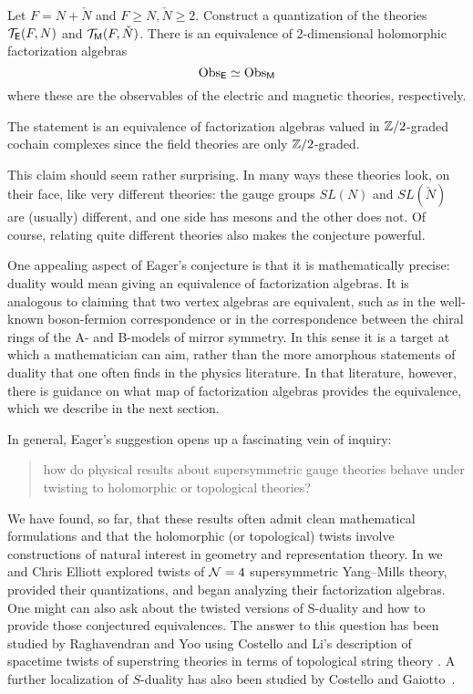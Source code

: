 \documentclass[11pt]{amsart}
\begin{document}
\begin{conj*}
Let $F = N + \check{N}$ and $F \geq N, \check{N} \geq 2$.
Construct a quantization of the theories $\mathcal T_{\mathsf E}(F,N)$ and $\mathcal T_{{\sf M}}(F,\check{N})$.
There is an equivalence of 2-dimensional holomorphic factorization algebras
\[
{\rm Obs}_{\mathsf E} \simeq {\rm Obs}_{{\sf M}}  
\]
where these are the observables of the electric and magnetic theories, respectively.
\end{conj*}

\begin{rmk}
The statement is an equivalence of factorization algebras valued in $\mathbb Z/2$-graded cochain complexes since the field theories are only $\mathbb Z/2$-graded.
\end{rmk}

This claim should seem rather surprising.
In many ways these theories look, on their face, like very different theories:
the gauge groups $SL(N)$ and $SL(\check{N})$ are (usually) different, and
one side has mesons and the other does not.
Of course, relating quite different theories also makes the conjecture powerful.

One appealing aspect of Eager's conjecture is that it is mathematically precise:
duality would mean giving an equivalence of factorization algebras.
It is analogous to claiming that two vertex algebras are equivalent,
such as in the well-known boson-fermion correspondence or in the correspondence between the chiral rings of the A- and B-models of mirror symmetry.
In this sense it is a target at which a mathematician can aim,
rather than the more amorphous statements of duality that one often finds in the physics literature.
In that literature, however, there is guidance on what map of factorization algebras provides the equivalence,
which we describe in the next section.

In general, Eager's suggestion opens up a fascinating vein of inquiry:
\begin{quote}
how do physical results about supersymmetric gauge theories behave under twisting to holomorphic or topological theories?
\end{quote}
We have found, so far, that these results often admit clean mathematical formulations and that the holomorphic (or topological) twists involve constructions of natural interest in geometry and representation theory.
In \cite{EGW} we and Chris Elliott explored twists of $\mathcal N=4$ supersymmetric Yang--Mills theory,
provided their quantizations, and began analyzing their factorization algebras.
One might can also ask about the twisted versions of S-duality and how to provide those conjectured equivalences.
The answer to this question has been studied by Raghavendran and Yoo \cite{RYsduality} using Costello and Li's description of spacetime twists of superstring theories in terms of topological string theory \cite{CLsugra,CLtypeI}. 
A further localization of $S$-duality has also been studied by Costello and Gaiotto~\cite{CGholography}.
\end{document}
